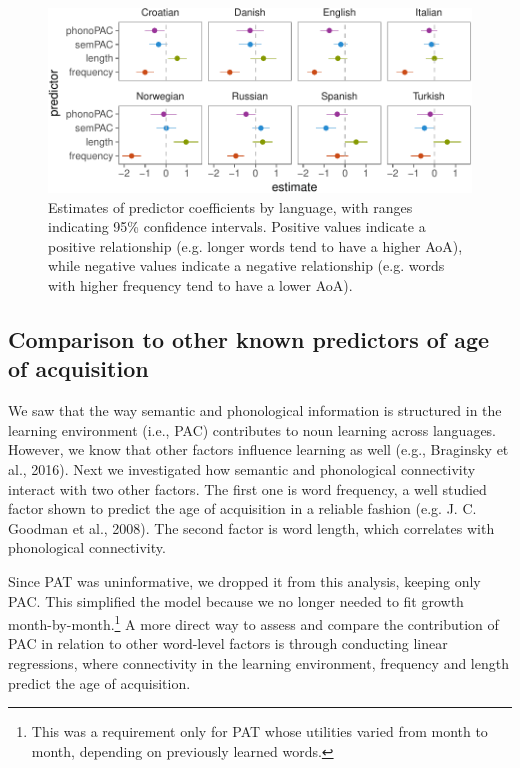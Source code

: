 \documentclass[10pt, letterpaper]{article}
\newenvironment{CodeChunk}{}{}
\begin{document}
\begin{CodeChunk}
\begin{figure}[h]

{\centering \includegraphics{figs/regressions_img-1} 

}

\caption{\label{fig:regressions_img}Estimates of predictor coefficients by language, with ranges indicating 95\% confidence intervals. Positive values indicate a positive relationship (e.g. longer words tend to have a higher AoA), while negative values indicate a negative relationship (e.g. words with higher frequency tend to have a lower AoA).}\label{fig:regressions_img}
\end{figure}
\end{CodeChunk}

\subsection{Comparison to other known predictors of age of
acquisition}\label{comparison-to-other-known-predictors-of-age-of-acquisition}

We saw that the way semantic and phonological information is structured
in the learning environment (i.e., PAC) contributes to noun learning
across languages. However, we know that other factors influence learning
as well (e.g., Braginsky et al., 2016). Next we investigated how
semantic and phonological connectivity interact with two other factors.
The first one is word frequency, a well studied factor shown to predict
the age of acquisition in a reliable fashion (e.g. J. C. Goodman et al.,
2008). The second factor is word length, which correlates with
phonological connectivity.

Since PAT was uninformative, we dropped it from this analysis, keeping
only PAC. This simplified the model because we no longer needed to fit
growth
month-by-month.\footnote{This was a requirement only for PAT whose utilities varied from month to month, depending on previously learned words.}
A more direct way to assess and compare the contribution of PAC in
relation to other word-level factors is through conducting linear
regressions, where connectivity in the learning environment, frequency
and length predict the age of acquisition.
\end{document}
